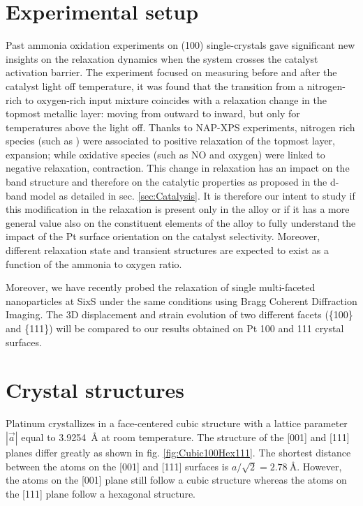 \section{Experimental setup}

Past ammonia oxidation experiments on  (100) \parencite{Resta2020} single-crystals gave significant new insights on the relaxation dynamics when the system crosses the catalyst activation barrier.
The experiment focused on measuring before and after the catalyst light off temperature, it was found that the transition from a nitrogen-rich to oxygen-rich input mixture coincides with a relaxation change in the topmost metallic layer: moving from outward to inward, but only for temperatures above the light off.
Thanks to NAP-XPS experiments, nitrogen rich species (such as \nitrogen) were associated to positive relaxation of the topmost layer, expansion; while oxidative species (such as NO and oxygen) were linked to negative relaxation, contraction.
This change in relaxation has an impact on the band structure and therefore on the catalytic properties as proposed in the d-band model as detailed in sec. \ref{sec:Catalysis}.
It is therefore our intent to study if this modification in the relaxation is present only in the  alloy or if it has a more general value also on the constituent elements of the alloy to fully understand the impact of the Pt surface orientation on the catalyst selectivity.
Moreover, different relaxation state and transient structures are expected to exist as a function of the ammonia to oxygen ratio.

Moreover, we have recently probed the relaxation of single multi-faceted nanoparticles at SixS under the same conditions using Bragg Coherent Diffraction Imaging.
The 3D displacement and strain evolution of two different facets (\{100\} and \{111\}) will be compared to our results obtained on Pt 100 and 111 crystal surfaces.

\section{Crystal structures}

Platinum crystallizes in a face-centered cubic structure with a lattice parameter $|\vec{a}|$ equal to \qty{3.9254}{\angstrom} at room temperature.
The structure of the [001] and [111] planes differ greatly as shown in fig. \ref{fig:Cubic100Hex111}.
The shortest distance between the atoms on the [001] and [111] surfaces is $a/\sqrt{2} = \qty{2.78}{\angstrom}$.
However, the atoms on the [001] plane still follow a cubic structure whereas the atoms on the [111] plane follow a hexagonal structure.

